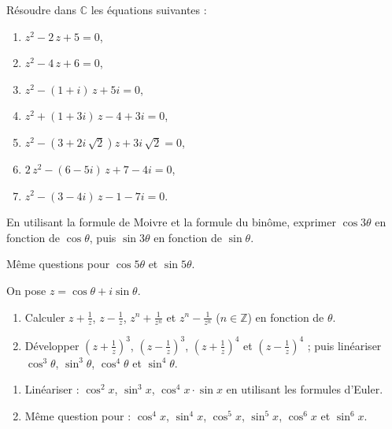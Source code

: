 %
\begin{exo}
      R\'esoudre dans $\mathbb{C}$ les \'equations suivantes : 
      \begin{enumerate}
            \item $z^{2} - 2 \, z + 5 = 0$,
            \item $z^{2} - 4 \, z + 6 = 0$,
            \item $z^{2} - \left(1 + i\right) \, z + 5 i = 0$,
            \item $z^{2} + \left(1 + 3 i\right) \, z - 4 + 3 i = 0$,
            \item $z^{2} - ( 3 +  2 i \, \sqrt{2} )z + 3 i \, \sqrt{2} = 0$,
            \item $2 \, z^{2} - \left(6 - 5i\right) \, z + 7 - 4 i = 0$,
            \item $z^{2} - \left(3 - 4 i\right) \, z - 1 - 7 i = 0$.
      \end{enumerate}
\end{exo}
%
\begin{exo}
      En utilisant la formule de Moivre et la formule du bin\^ome, exprimer $\cos 3\theta$ en fonction de $\cos \theta$,
      puis $\sin 3\theta$ en fonction de $\sin \theta$.
      
      M\^eme questions pour $\cos 5\theta$ et $\sin 5\theta$.
\end{exo}
%
\begin{exo}
      On pose $z = \cos \theta + i \sin \theta$.
      \begin{enumerate}
            \item Calculer $z + \frac{1}{z}$, $z - \frac{1}{z}$, 
                  $z^n + \frac{1}{z^n}$ et $z^n - \frac{1}{z^n}$ ($n\in\mathbb{Z}$)
                  en fonction de $\theta$.
            \item D\'evelopper 
                  $\left( z + \frac{1}{z} \right)^3$,
                  $\left( z - \frac{1}{z} \right)^3$,
                  $\left( z + \frac{1}{z} \right)^4$ et
                  $\left( z - \frac{1}{z} \right)^4$ ; 
                  puis lin\'eariser $\cos^3 \theta$, $\sin^3 \theta$, $\cos^4 \theta$ et $\sin^4 \theta$.
      \end{enumerate}
\end{exo}
%
\begin{exo}
      \begin{enumerate}
            \item Lin\'eariser : $\cos ^2 x$, $\sin^3 x$, $\cos^4 x \cdot \sin x$ en utilisant les formules d'Euler.
            \item M\^eme question pour : $\cos^4 x$, $\sin^4 x$, $\cos^5 x$, $\sin^5 x$, $\cos^6 x$ et $\sin^6 x$.
      \end{enumerate}
\end{exo}
